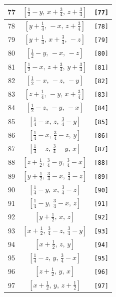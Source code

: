 \documentclass[fleqn,8pt]{jsarticle}
\begin{document}
\begin{longtable}{ccc}
77 & $\left[ \frac{1}{2} - y,\, x + \frac{3}{4},\, z + \frac{3}{4} \right]$ & {\tt [77]} \\ \hline
78 & $\left[ y + \frac{1}{4},\, - x,\, z + \frac{3}{4} \right]$ & {\tt [78]} \\ \hline
79 & $\left[ y + \frac{1}{4},\, x + \frac{3}{4},\, - z \right]$ & {\tt [79]} \\ \hline
80 & $\left[ \frac{1}{2} - y,\, - x,\, - z \right]$ & {\tt [80]} \\ \hline
81 & $\left[ \frac{1}{2} - x,\, z + \frac{3}{4},\, y + \frac{3}{4} \right]$ & {\tt [81]} \\ \hline
82 & $\left[ \frac{1}{2} - x,\, - z,\, - y \right]$ & {\tt [82]} \\ \hline
83 & $\left[ z + \frac{1}{4},\, - y,\, x + \frac{3}{4} \right]$ & {\tt [83]} \\ \hline
84 & $\left[ \frac{1}{2} - z,\, - y,\, - x \right]$ & {\tt [84]} \\ \hline
85 & $\left[ \frac{1}{4} - x,\, z,\, \frac{3}{4} - y \right]$ & {\tt [85]} \\ \hline
86 & $\left[ \frac{1}{4} - x,\, \frac{3}{4} - z,\, y \right]$ & {\tt [86]} \\ \hline
87 & $\left[ \frac{1}{4} - z,\, \frac{3}{4} - y,\, x \right]$ & {\tt [87]} \\ \hline
88 & $\left[ z + \frac{1}{2},\, \frac{3}{4} - y,\, \frac{3}{4} - x \right]$ & {\tt [88]} \\ \hline
89 & $\left[ y + \frac{1}{2},\, \frac{3}{4} - x,\, \frac{3}{4} - z \right]$ & {\tt [89]} \\ \hline
90 & $\left[ \frac{1}{4} - y,\, x,\, \frac{3}{4} - z \right]$ & {\tt [90]} \\ \hline
91 & $\left[ \frac{1}{4} - y,\, \frac{3}{4} - x,\, z \right]$ & {\tt [91]} \\ \hline
92 & $\left[ y + \frac{1}{2},\, x,\, z \right]$ & {\tt [92]} \\ \hline
93 & $\left[ x + \frac{1}{2},\, \frac{3}{4} - z,\, \frac{3}{4} - y \right]$ & {\tt [93]} \\ \hline
94 & $\left[ x + \frac{1}{2},\, z,\, y \right]$ & {\tt [94]} \\ \hline
95 & $\left[ \frac{1}{4} - z,\, y,\, \frac{3}{4} - x \right]$ & {\tt [95]} \\ \hline
96 & $\left[ z + \frac{1}{2},\, y,\, x \right]$ & {\tt [96]} \\ \hline
97 & $\left[ x + \frac{1}{2},\, y,\, z + \frac{1}{2} \right]$ & {\tt [97]} \\ \hline

\end{longtable}
\end{document}

